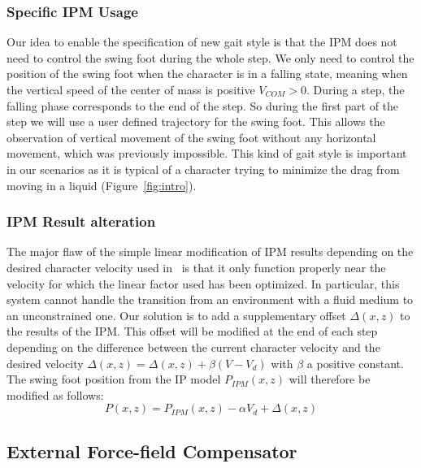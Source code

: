 \documentclass[conference]{acmsiggraph}
\begin{document}
\subsubsection{Specific IPM Usage}
\label{sec:specific_ipm}

Our idea to enable the specification of new gait style is that the IPM does not need to control the swing foot during the whole step. We only need to control the position of the swing foot when the character is in a falling state, meaning when the vertical speed of the center of mass is positive $V_{COM}>0$. During a step, the falling phase corresponds to the end of the step. So during the first part of the step we will use a user defined trajectory for the swing foot. This allows the observation of vertical movement of the swing foot without any horizontal movement, which was previously impossible. This kind of gait style is important in our scenarios as it is typical of a character trying to minimize the drag from moving in a liquid (Figure~\ref{fig:intro}).

\subsubsection{IPM Result alteration}
\label{sec:ipm_alt}

The major flaw of the simple linear modification of IPM results depending on the desired character velocity used in~\cite{coros2010generalized} is that it only function properly near the velocity for which the linear factor used has been optimized. %
In particular, this system cannot handle the transition from an environment with a fluid medium to an unconstrained one. Our solution is to add a supplementary offset $\Delta(x,z)$ to the results of the IPM. This offset will be modified at the end of each step depending on the difference between the current character velocity and the desired velocity $\Delta(x,z) = \Delta(x,z)+\beta(V-V_d)$ with $\beta$ a positive constant. The swing foot position from the IP model $P_{IPM}(x,z)$ will therefore be modified as follows:
$$
P(x,z) = P_{IPM}(x,z) - \alpha V_d + \Delta(x,z)
$$ 

\subsection{External Force-field Compensator}
\label{sec:ext_force_comp}
\end{document}
